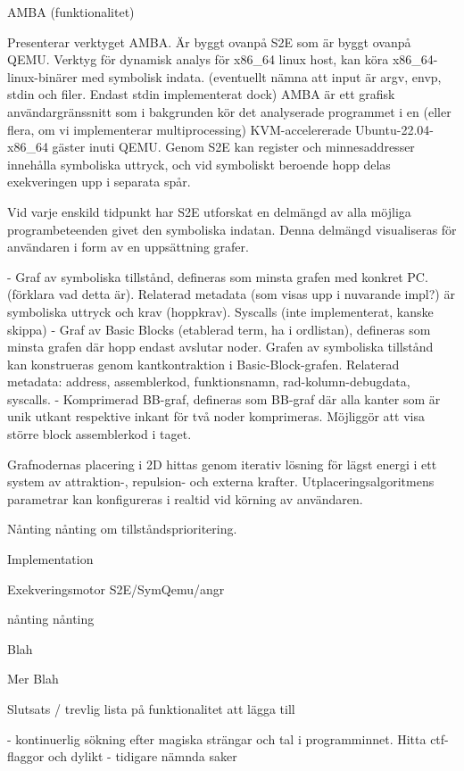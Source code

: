 AMBA (funktionalitet)

Presenterar verktyget AMBA. Är byggt ovanpå S2E som är byggt ovanpå
QEMU. Verktyg för dynamisk analys för x86\_64 linux host, kan köra
x86\_64-linux-binärer med symbolisk indata. (eventuellt nämna att
input är argv, envp, stdin och filer. Endast stdin implementerat dock)
AMBA är ett grafisk användargränssnitt som i bakgrunden kör det
analyserade programmet i en (eller flera, om vi implementerar
multiprocessing) KVM-accelererade Ubuntu-22.04-x86\_64 gäster inuti
QEMU. Genom S2E kan register och minnesaddresser innehålla symboliska
uttryck, och vid symboliskt beroende hopp delas exekveringen upp i
separata spår.

Vid varje enskild tidpunkt har S2E utforskat en delmängd av alla
möjliga programbeteenden givet den symboliska indatan. Denna delmängd
visualiseras för användaren i form av en uppsättning grafer.

- Graf av symboliska tillstånd, defineras som minsta grafen med
    konkret PC. (förklara vad detta är). Relaterad metadata (som visas
    upp i nuvarande impl?) är symboliska uttryck och krav
    (hoppkrav). Syscalls (inte implementerat, kanske skippa)
- Graf av Basic Blocks (etablerad term, ha i ordlistan), defineras som
    minsta grafen där hopp endast avslutar noder. Grafen av symboliska
    tillstånd kan konstrueras genom kantkontraktion i
    Basic-Block-grafen. Relaterad metadata: address, assemblerkod,
    funktionsnamn, rad-kolumn-debugdata, syscalls.
- Komprimerad BB-graf, defineras som BB-graf där alla kanter som är
    unik utkant respektive inkant för två noder komprimeras. Möjliggör
    att visa större block assemblerkod i taget.

Grafnodernas placering i 2D hittas genom iterativ lösning för lägst
energi i ett system av attraktion-, repulsion- och externa
krafter. Utplaceringsalgoritmens parametrar kan konfigureras i realtid
vid körning av användaren.

Nånting nånting om tillståndsprioritering.

Implementation

Exekveringsmotor S2E/SymQemu/angr

nånting nånting

Blah

Mer Blah

Slutsats / trevlig lista på funktionalitet att lägga till

- kontinuerlig sökning efter magiska strängar och tal i
    programminnet. Hitta ctf-flaggor och dylikt
- tidigare nämnda saker
